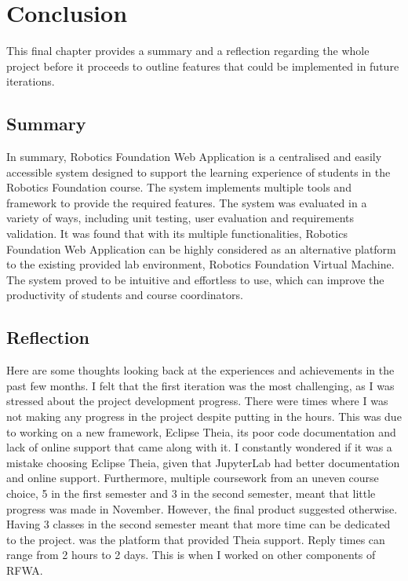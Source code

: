 \documentclass{l4proj}
\begin{document}
\chapter{Conclusion}    
This final chapter provides a summary and a reflection regarding the whole project before it proceeds to outline features that could be implemented in future iterations. 

\section{Summary}

In summary, Robotics Foundation Web Application is a centralised and easily accessible system designed to support the learning experience of students in the Robotics Foundation course. The system implements multiple tools and framework to provide the required features. The system was evaluated in a variety of ways, including unit testing, user evaluation and requirements validation. It was found that with its multiple functionalities, Robotics Foundation Web Application can be highly considered as an alternative platform to the existing provided lab environment, Robotics Foundation Virtual Machine. The system proved to be intuitive and effortless to use, which can improve the productivity of students and course coordinators.

\section{Reflection}

Here are some thoughts looking back at the experiences and achievements in the past few months. I felt that the first iteration was the most challenging, as I was stressed about the project development progress. There were times where I was not making any progress in the project despite putting in the hours. This was due to working on a new framework, Eclipse Theia, its poor code documentation and lack of online support that came along with it. I constantly wondered if it was a mistake choosing Eclipse Theia, given that JupyterLab had better documentation and online support. Furthermore, multiple coursework from an uneven course choice, 5 in the first semester and 3 in the second semester, meant that little progress was made in November. However, the final product suggested otherwise. Having 3 classes in the second semester meant that more time can be dedicated to the project. \cite{SpectrumChat} was the platform that provided Theia support. Reply times can range from 2 hours to 2 days. This is when I worked on other components of RFWA.
\end{document}
